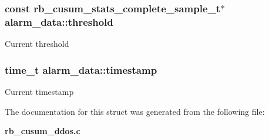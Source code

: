 \subsubsection[{threshold}]{\setlength{\rightskip}{0pt plus 5cm}const {\bf rb\_cusum\_stats\_complete\_sample\_t}$\ast$ alarm\_data\+::threshold}
Current threshold

\subsubsection[{timestamp}]{\setlength{\rightskip}{0pt plus 5cm}time\_t alarm\_data\+::timestamp}
Current timestamp


The documentation for this struct was generated from the following file\+:\begin{DoxyCompactItemize}
\item 
{\bf rb\_cusum\_ddos.\+c}\end{DoxyCompactItemize}
